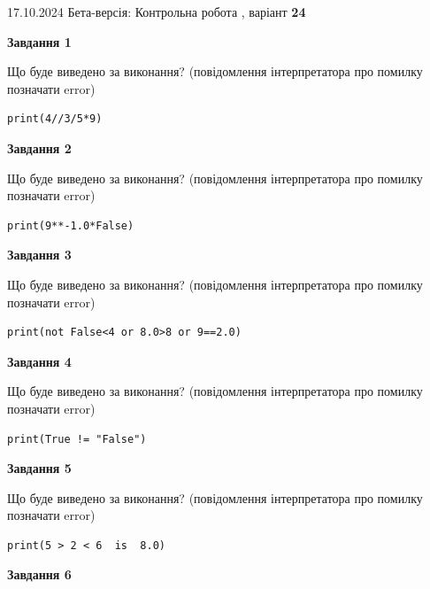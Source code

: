 \documentclass[12pt, ukrainian]{article}
\begin{document}
{\Large{17.10.2024 Бета-версія: Контрольна робота , варіант  \No \textbf { 24 }\par}}
{
\begin {large}
{\begin {center}\textbf{Завдання 1}\end {center}}

Що буде виведено за виконання? (повідомлення інтерпретатора про помилку позначати error)\par
\begin{verbatim}
print(4//3/5*9)
\end{verbatim}

{\begin {center}\textbf{Завдання 2}\end {center}}

Що буде виведено за виконання? (повідомлення інтерпретатора про помилку позначати error)\par
\begin{verbatim}
print(9**-1.0*False)
\end{verbatim}

{\begin {center}\textbf{Завдання 3}\end {center}}

Що буде виведено за виконання? (повідомлення інтерпретатора про помилку позначати error)\par
\begin{verbatim}
print(not False<4 or 8.0>8 or 9==2.0)
\end{verbatim}

{\begin {center}\textbf{Завдання 4}\end {center}}

Що буде виведено за виконання? (повідомлення інтерпретатора про помилку позначати error)\par
\begin{verbatim}
print(True != "False")
\end{verbatim}

{\begin {center}\textbf{Завдання 5}\end {center}}

Що буде виведено за виконання? (повідомлення інтерпретатора про помилку позначати error)\par
\begin{verbatim}
print(5 > 2 < 6  is  8.0)
\end{verbatim}

{\begin {center}\textbf{Завдання 6}\end {center}}


\end{large}}
\end{document}

